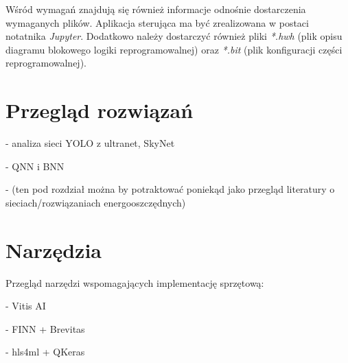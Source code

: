 Wśród wymagań znajdują się również informacje odnośnie dostarczenia wymaganych plików.
Aplikacja sterująca ma być zrealizowana w postaci notatnika \emph{Jupyter}.
Dodatkowo należy dostarczyć również pliki \emph{*.hwh} (plik opisu diagramu blokowego logiki reprogramowalnej)
oraz \emph{*.bit} (plik konfiguracji części reprogramowalnej).


\section{Przegląd rozwiązań}
- analiza sieci YOLO z ultranet, SkyNet

- QNN i BNN

- (ten pod rozdział można by potraktować poniekąd jako przegląd literatury o sieciach/rozwiązaniach energooszczędnych)


\section{Narzędzia}
Przegląd narzędzi wspomagających implementację sprzętową:

- Vitis AI

- FINN + Brevitas

- hls4ml + QKeras



    

